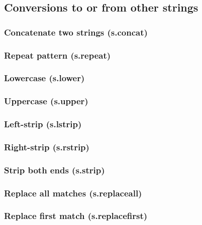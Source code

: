 \documentclass{article}
\theoremstyle{definition}
\begin{document}
\subsection{Conversions to or from other strings}

\subsubsection{Concatenate two strings (s.concat)}

\subsubsection{Repeat pattern (s.repeat)}

\subsubsection{Lowercase (s.lower)}

\subsubsection{Uppercase (s.upper)}

\subsubsection{Left-strip (s.lstrip)}

\subsubsection{Right-strip (s.rstrip)}

\subsubsection{Strip both ends (s.strip)}

\subsubsection{Replace all matches (s.replaceall)}

\subsubsection{Replace first match (s.replacefirst)}
\end{document}
